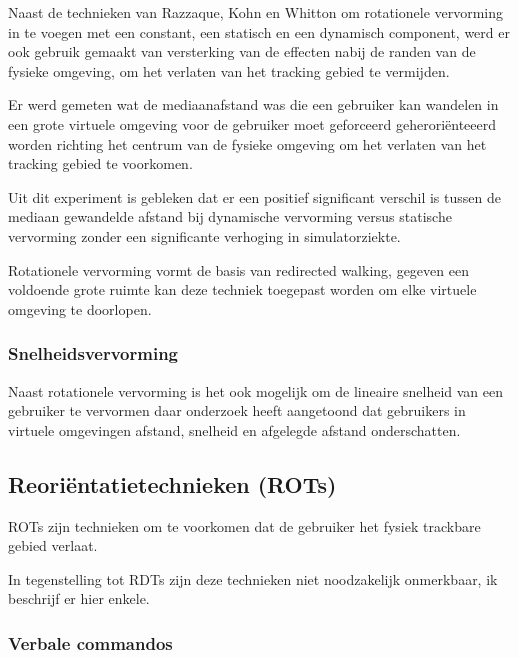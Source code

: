 \documentclass[a4paper,12pt]{article}
\begin{document}
Naast de technieken van Razzaque, Kohn en Whitton\cite{kohn01} om rotationele
vervorming in te voegen met een constant, een statisch en een dynamisch component,
werd er ook gebruik gemaakt van versterking van de effecten nabij de randen van
de fysieke omgeving, om het verlaten van het tracking gebied te vermijden.

Er werd gemeten wat de mediaanafstand was die een gebruiker kan wandelen in een
grote virtuele omgeving voor de gebruiker moet geforceerd geherori\"enteeerd
worden richting het centrum van de fysieke omgeving om het verlaten van het
tracking gebied te voorkomen.

Uit dit experiment is gebleken dat er een positief significant verschil is tussen
de mediaan gewandelde afstand bij dynamische vervorming versus statische
vervorming zonder een significante verhoging in simulatorziekte.

Rotationele vervorming vormt de basis van redirected walking, gegeven een
voldoende grote ruimte kan deze techniek toegepast worden om elke virtuele
omgeving te doorlopen.


\subsubsection{Snelheidsvervorming}
Naast rotationele vervorming is het ook mogelijk om de lineaire snelheid van een
gebruiker te vervormen daar onderzoek heeft aangetoond dat gebruikers in virtuele
omgevingen afstand\cite{loomis03}, snelheid\cite{banton05} en afgelegde afstand
\cite{frenz07} onderschatten.



\subsection{Reori\"entatietechnieken (ROTs)}
ROTs zijn technieken om te voorkomen dat de gebruiker het fysiek trackbare gebied
verlaat.

In tegenstelling tot RDTs zijn deze technieken niet noodzakelijk onmerkbaar, ik
beschrijf er hier enkele.


\subsubsection{Verbale commandos}
\end{document}

